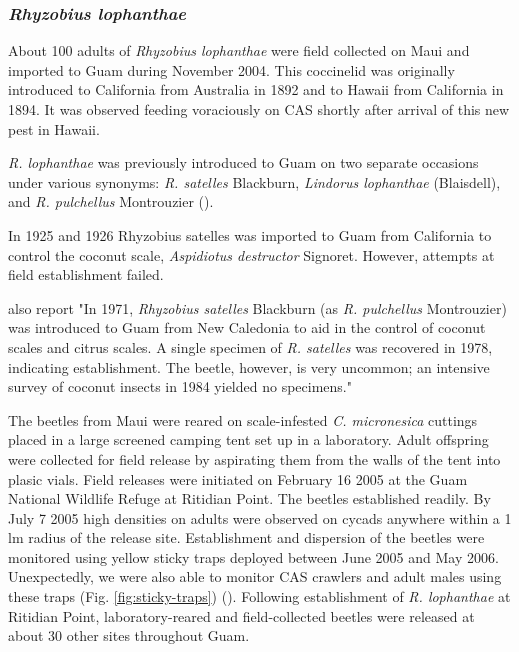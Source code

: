 \documentclass[12pt,letterpaper,english,bibliography=totocnumbered, abstract=on]{scrartcl}
\begin{document}
\subsubsection{\textit{Rhyzobius lophanthae}}

About 100 adults of \textit{Rhyzobius lophanthae} were field collected on Maui and imported to Guam during November 2004. This coccinelid was originally 
introduced to California from Australia in 1892 and to Hawaii from California in 1894. It was observed feeding voraciously on CAS shortly after arrival of this new pest in Hawaii. 

\textit{R. lophanthae} was previously introduced to Guam on two separate occasions under various synonyms: \textit{R. satelles} Blackburn, \textit{Lindorus lophanthae} (Blaisdell), and \textit{R. pulchellus} Montrouzier (\cite{nafus_biological_1989}). 

In 1925 and 1926 Rhyzobius satelles was imported to Guam from California to control the coconut scale, \textit{Aspidiotus destructor} Signoret. However, attempts at field establishment failed.  

\cite{nafus_biological_1989} also report "In 1971, \textit{Rhyzobius satelles} Blackburn (as \textit{R. pulchellus} Montrouzier) was introduced to Guam from New Caledonia to aid in the control of coconut scales and citrus scales. A single specimen of \textit{R. satelles} was recovered in 1978, indicating establishment. The beetle, however, is very uncommon; an intensive survey of coconut insects in 1984 yielded no specimens."

The beetles from Maui were reared on scale-infested \textit{C. micronesica} cuttings placed in a large screened camping tent set up in a laboratory. Adult offspring were collected for field release by aspirating them from the walls of the tent into plasic vials. Field releases were initiated on February 16 2005 at the Guam National Wildlife Refuge at Ritidian Point. The beetles established readily. By July 7 2005 high densities on adults were observed on cycads anywhere within a 1 lm radius of the release site.  Establishment and dispersion of the beetles were monitored using yellow sticky traps deployed between June 2005 and May 2006. Unexpectedly, we were also able to monitor CAS crawlers and adult males using these traps (Fig. \ref{fig:sticky-traps})  (\cite{moore_biological_2017-2}). Following establishment of \textit{R. lophanthae} at Ritidian Point, laboratory-reared and field-collected beetles were released at about 30 other sites throughout Guam. 
\end{document}
